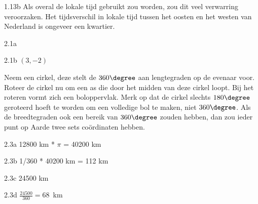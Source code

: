 \begin{Antwoord}{1.13b}
   Als overal de lokale tijd gebruikt zou worden, zou dit veel verwarring veroorzaken. Het tijdsverschil in lokale tijd tussen het oosten en het westen van Nederland is ongeveer een kwartier.
  
\end{Antwoord}
\begin{Antwoord}{2.1a}
		
\end{Antwoord}
\begin{Antwoord}{2.1b}
			$(3, -2)$
		
\end{Antwoord}
\begin{Antwoord}{2.2}
		Neem een cirkel, deze stelt de $360\degree$ aan lengtegraden op de evenaar voor. Roteer de cirkel nu om een as die door het midden van deze cirkel loopt. Bij het roteren vormt zich een boloppervlak. Merk op dat de cirkel slechts $180\degree$ geroteerd hoeft te worden om een volledige bol te maken, niet $360\degree$. Als de breedtegraden ook een bereik van $360\degree$ zouden hebben, dan zou ieder punt op Aarde twee sets co\"ordinaten hebben.
	
\end{Antwoord}
\begin{Antwoord}{2.3a}
			12800 km * $\pi$ = 40200 km
		
\end{Antwoord}
\begin{Antwoord}{2.3b}
			1/360 * 40200 km = 112 km
		
\end{Antwoord}
\begin{Antwoord}{2.3c}
			24500 km
		
\end{Antwoord}
\begin{Antwoord}{2.3d}
			$\frac{24500}{360} = 68$~km
		
\end{Antwoord}
